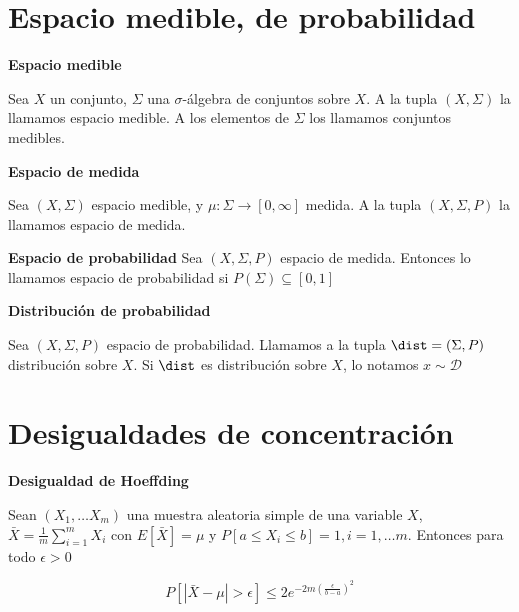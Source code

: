 \section{Espacio medible, de probabilidad}

\begin{definition} \textbf{Espacio medible}

 Sea $X$ un conjunto, $\Sigma$ una $\sigma$-álgebra de conjuntos sobre $X$. A la tupla $(X,\Sigma)$ la llamamos
 espacio medible. A los elementos de $\Sigma$ los llamamos conjuntos medibles.
\end{definition}


\begin{definition} \textbf{Espacio de medida}

 Sea $(X, \Sigma)$ espacio medible, y $\mu: \Sigma \rightarrow [0,\infty]$ medida. A la tupla $(X, \Sigma, P)$ 
 la llamamos espacio de medida.
\end{definition}


\begin{definition} \textbf{Espacio de probabilidad}
 Sea $(X, \Sigma, P)$ espacio de medida. Entonces lo llamamos espacio de probabilidad si $P(\Sigma)\subseteq [0,1]$
\end{definition}


\begin{definition} \textbf{Distribución de probabilidad}

 Sea $(X, \Sigma, P)$ espacio de probabilidad. Llamamos a la tupla $\dist = (\Sigma,P)$ distribución sobre $X$. 
 Si $\dist$ es distribución sobre $X$, lo notamos $x\sim \mathcal{D}$
\end{definition}


\section{Desigualdades de concentración}
\begin{lemma} \textbf{Desigualdad de Hoeffding}

 Sean $(X_1, \ldots X_m)$ una muestra aleatoria simple de una variable $X$, 
 $\bar{X} = \frac{1}{m} \sum_{i=1}^m X_i$ con $E[\bar{X}] = \mu$ y $P[a \le X_i \le b] = 1, i=1, \ldots m$. 
 Entonces para todo $\epsilon > 0$

 \[P\left[\left| \bar{X} - \mu \right| > \epsilon \right] \le 2e^{-2m \left(\frac{\epsilon}{b-a}\right)^2}\]
\end{lemma}